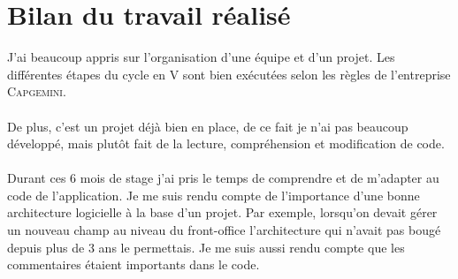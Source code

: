 \section{Bilan du travail réalisé}

J'ai beaucoup appris sur l'organisation d'une équipe et d'un projet. Les différentes étapes du cycle en V sont bien exécutées selon les règles de l'entreprise \textsc{Capgemini}.
\\\\De plus, c'est un projet déjà bien en place, de ce fait je n'ai pas beaucoup développé, mais plutôt fait de la lecture, compréhension et modification de code.
\\\\Durant ces 6 mois de stage j'ai pris le temps de comprendre et de m'adapter au code de l'application. Je me suis rendu compte de l'importance d'une bonne architecture logicielle à la base d'un projet. Par exemple, lorsqu'on devait gérer un nouveau champ au niveau du front-office l'architecture qui n'avait pas bougé depuis plus de 3 ans le permettais. Je me suis aussi rendu compte que les commentaires étaient importants dans le code.

